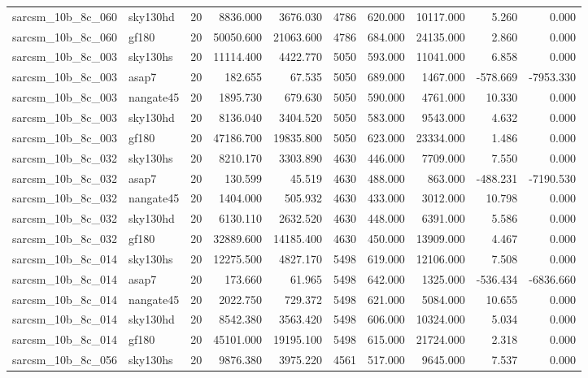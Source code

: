 \documentclass{article}
\begin{document}
\begin{longtable}{llrrrrrrrr}
sarcsm\_10b\_8c\_060 & sky130hd & 20 & 8836.000 & 3676.030 & 4786 & 620.000 & 10117.000 & 5.260 & 0.000 \\
sarcsm\_10b\_8c\_060 & gf180 & 20 & 50050.600 & 21063.600 & 4786 & 684.000 & 24135.000 & 2.860 & 0.000 \\
sarcsm\_10b\_8c\_003 & sky130hs & 20 & 11114.400 & 4422.770 & 5050 & 593.000 & 11041.000 & 6.858 & 0.000 \\
sarcsm\_10b\_8c\_003 & asap7 & 20 & 182.655 & 67.535 & 5050 & 689.000 & 1467.000 & -578.669 & -7953.330 \\
sarcsm\_10b\_8c\_003 & nangate45 & 20 & 1895.730 & 679.630 & 5050 & 590.000 & 4761.000 & 10.330 & 0.000 \\
sarcsm\_10b\_8c\_003 & sky130hd & 20 & 8136.040 & 3404.520 & 5050 & 583.000 & 9543.000 & 4.632 & 0.000 \\
sarcsm\_10b\_8c\_003 & gf180 & 20 & 47186.700 & 19835.800 & 5050 & 623.000 & 23334.000 & 1.486 & 0.000 \\
sarcsm\_10b\_8c\_032 & sky130hs & 20 & 8210.170 & 3303.890 & 4630 & 446.000 & 7709.000 & 7.550 & 0.000 \\
sarcsm\_10b\_8c\_032 & asap7 & 20 & 130.599 & 45.519 & 4630 & 488.000 & 863.000 & -488.231 & -7190.530 \\
sarcsm\_10b\_8c\_032 & nangate45 & 20 & 1404.000 & 505.932 & 4630 & 433.000 & 3012.000 & 10.798 & 0.000 \\
sarcsm\_10b\_8c\_032 & sky130hd & 20 & 6130.110 & 2632.520 & 4630 & 448.000 & 6391.000 & 5.586 & 0.000 \\
sarcsm\_10b\_8c\_032 & gf180 & 20 & 32889.600 & 14185.400 & 4630 & 450.000 & 13909.000 & 4.467 & 0.000 \\
sarcsm\_10b\_8c\_014 & sky130hs & 20 & 12275.500 & 4827.170 & 5498 & 619.000 & 12106.000 & 7.508 & 0.000 \\
sarcsm\_10b\_8c\_014 & asap7 & 20 & 173.660 & 61.965 & 5498 & 642.000 & 1325.000 & -536.434 & -6836.660 \\
sarcsm\_10b\_8c\_014 & nangate45 & 20 & 2022.750 & 729.372 & 5498 & 621.000 & 5084.000 & 10.655 & 0.000 \\
sarcsm\_10b\_8c\_014 & sky130hd & 20 & 8542.380 & 3563.420 & 5498 & 606.000 & 10324.000 & 5.034 & 0.000 \\
sarcsm\_10b\_8c\_014 & gf180 & 20 & 45101.000 & 19195.100 & 5498 & 615.000 & 21724.000 & 2.318 & 0.000 \\
sarcsm\_10b\_8c\_056 & sky130hs & 20 & 9876.380 & 3975.220 & 4561 & 517.000 & 9645.000 & 7.537 & 0.000 \\

\end{longtable}
\end{document}
